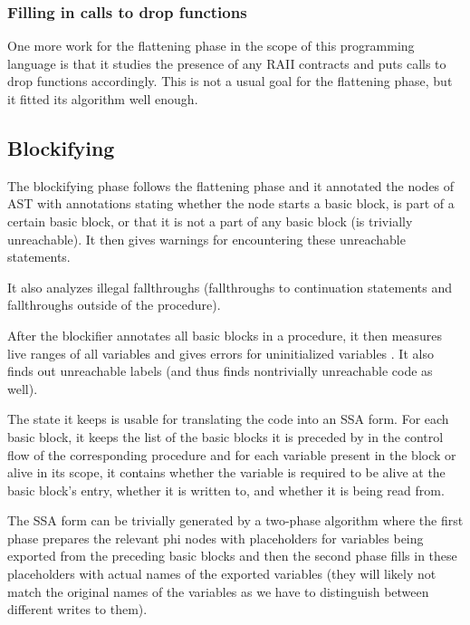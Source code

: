 \subsubsection{Filling in calls to drop functions}

One more work for the flattening phase in the scope of this programming language is that it studies the presence of any RAII contracts and puts calls to drop functions accordingly. This is not a usual goal for the flattening phase, but it fitted its algorithm well enough.

\subsection{Blockifying}

The blockifying phase follows the flattening phase and it annotated the nodes of AST with annotations stating whether the node starts a basic block, is part of a certain basic block, or that it is not a part of any basic block (is trivially unreachable). It then gives warnings for encountering these unreachable statements.

It also analyzes illegal fallthroughs (fallthroughs to continuation statements and fallthroughs outside of the procedure).



After the blockifier annotates all basic blocks in a procedure, it then measures live ranges of all variables and gives errors for uninitialized variables . It also finds out unreachable labels (and thus finds nontrivially unreachable code as well).

The state it keeps is usable for translating the code into an SSA form. For each basic block, it keeps the list of the basic blocks it is preceded by in the control flow of the corresponding procedure and for each variable present in the block or alive in its scope, it contains whether the variable is required to be alive at the basic block's entry, whether it is written to, and whether it is being read from.

The SSA form can be trivially generated by a two-phase algorithm where the first phase prepares the relevant phi nodes with placeholders for variables being exported from the preceding basic blocks and then the second phase fills in these placeholders with actual names of the exported variables (they will likely not match the original names of the variables as we have to distinguish between different writes to them).

